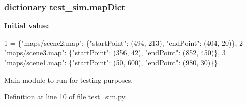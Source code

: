 \hypertarget{namespacetest__sim_a7550c4b395516fd2fa13ebfd927c9908}{
\subsubsection[{map\-Dict}]{\setlength{\rightskip}{0pt plus 5cm}dictionary test\-\_\-sim.\-map\-Dict}}\label{namespacetest__sim_a7550c4b395516fd2fa13ebfd927c9908}
{\bfseries Initial value\-:}
\begin{DoxyCode}
1 = \{\textcolor{stringliteral}{"maps/scene2.map"}: \{\textcolor{stringliteral}{"startPoint"}: (494, 213), \textcolor{stringliteral}{"endPoint"}: (404, 20)\}, 
2                \textcolor{stringliteral}{"maps/scene3.map"}: \{\textcolor{stringliteral}{"startPoint"}: (356, 42), \textcolor{stringliteral}{"endPoint"}: (852, 450)\}, 
3                \textcolor{stringliteral}{"maps/scene1.map"}: \{\textcolor{stringliteral}{"startPoint"}: (50, 600), \textcolor{stringliteral}{"endPoint"}: (980, 30)\}\}
\end{DoxyCode}


Main module to run for testing purposes. 



Definition at line 10 of file test\-\_\-sim.\-py.

